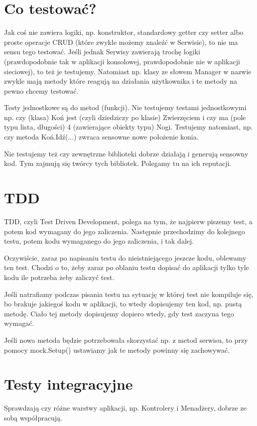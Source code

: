 \documentclass[10pt]{article}
\begin{document}
\section{Co testować?} \label{Co testować?}
Jak coś nie zawiera logiki, np. konstruktor, standardowy getter czy setter albo proste operacje CRUD (które zwykle możemy znaleźć w Serwisie), to nie ma sensu tego testować. Jeśli jednak Serwisy zawierają trochę logiki (prawdopodobnie tak w aplikacji konsolowej, prawdopodobnie nie w aplikacji sieciowej), to też je testujemy. Natomiast np. klasy ze słowem Manager w nazwie zwykle mają metody które reagują na działania użytkownika i te metody na pewno chcemy testować.

Testy jednostkowe są do metod (funkcji). Nie testujemy testami jednostkowymi np. czy (klasa) Koń jest (czyli dziedziczy po klasie) Zwierzęciem i czy ma (pole typu lista, długości) 4 (zawierające obiekty typu) Nogi. Testujemy natomiast, np. czy metoda Koń.Idź(...) zwraca sensowne nowe położenie konia.

Nie testujemy też czy zewnętrzne biblioteki dobrze działają i generują sensowny kod. Tym zajmują się twórcy tych bibliotek. Polegamy tu na ich reputacji.

\section{TDD}
TDD, czyli Test Driven Development, polega na tym, że najpierw piszemy test, a potem kod wymagany do jego zaliczenia. Następnie przechodzimy do kolejnego testu, potem kodu wymaganego do jego zaliczenia, i tak dalej.

Oczywiście, zaraz po napisaniu testu do nieistniejącego jeszcze kodu, oblewamy ten test. Chodzi o to, żeby zaraz po oblaniu testu dopisać do aplikacji tylko tyle kodu ile potrzeba żeby zaliczyć test.

Jeśli natrafiamy podczas pisania testu na sytuację w której test nie kompiluje się, bo brakuje jakiegoś kodu w aplikacji, to wtedy dopisujemy ten kod, np. pustą metodę. Ciało tej metody dopisujemy dopiero wtedy, gdy test zaczyna tego wymagać.

Jeśli nowa metoda będzie potrzebowała skorzystać np. z metod serwisu, to przy pomocy mock.Setup() ustawiamy jak te metody powinny się zachowywać.

\section{Testy integracyjne}
Sprawdzają czy różne warstwy aplikacji, np. Kontrolery i Menadżery, dobrze ze sobą współpracują.
\end{document}
